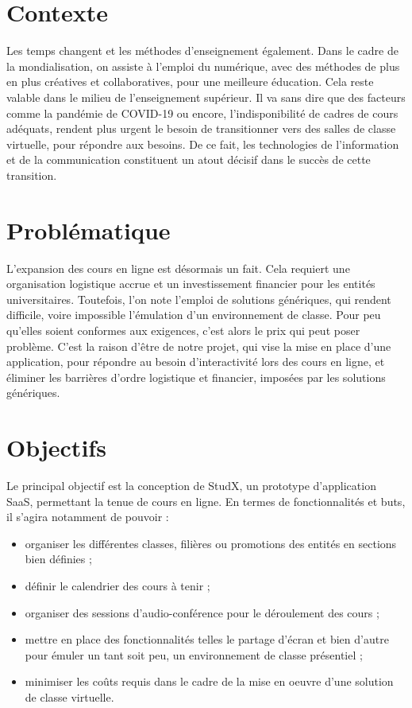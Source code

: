 
\introduction

\thispagestyle{plain} %

\section*{Contexte}
Les temps changent et les méthodes d’enseignement également. 
Dans le cadre de la mondialisation, on assiste à l'emploi du numérique, 
avec des méthodes de plus en plus créatives et collaboratives, 
pour une meilleure éducation. Cela reste valable dans le milieu de l’enseignement supérieur.
Il va sans dire que des facteurs comme la pandémie de COVID-19 ou encore, 
l'indisponibilité de cadres de cours adéquats, 
rendent plus urgent le besoin de transitionner 
vers des salles de classe virtuelle, pour répondre aux besoins. 
De ce fait, les technologies de l’information et 
de la communication constituent un atout décisif dans le succès de cette transition.

\section*{Problématique}
L’expansion des cours en ligne est désormais un fait. 
Cela requiert une organisation logistique accrue et un investissement financier pour les entités universitaires. 
Toutefois, l’on note l’emploi de solutions génériques, qui rendent difficile, 
voire impossible l'émulation d’un environnement de classe. 
Pour peu qu’elles soient conformes aux exigences, c’est alors le prix qui peut poser problème. 
C’est la raison d'être de notre projet, qui vise la mise en place d’une application, 
pour répondre au besoin d'interactivité lors des cours en ligne, 
et éliminer les barrières d’ordre logistique et financier, imposées par les solutions génériques.

\section*{Objectifs}
Le principal objectif est la conception de StudX, un prototype d’application SaaS, permettant la tenue de cours en ligne.
En termes de fonctionnalités et buts, il s’agira notamment de pouvoir :
\begin{itemize}
  \item organiser les différentes classes, filières ou promotions des entités en sections bien définies ;
  \item définir le calendrier des cours à tenir ;
  \item organiser des sessions d’audio-conférence pour le déroulement des cours ;
  \item mettre en place des fonctionnalités telles le partage d'écran et bien d’autre pour émuler un tant soit peu, 
    un environnement de classe présentiel ;
  \item minimiser les coûts requis dans le cadre de la mise en oeuvre d’une solution de classe virtuelle.
\end{itemize}

